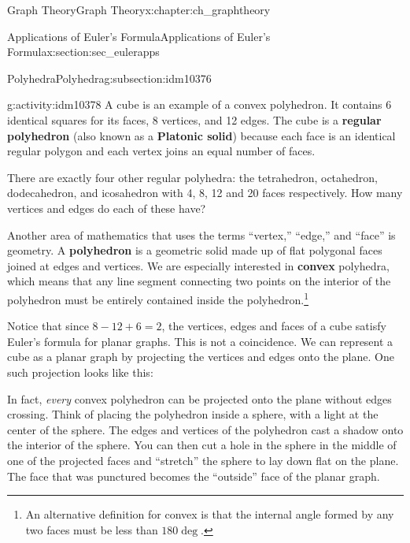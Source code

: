 \documentclass[oneside,10pt,]{book}
\newcommand{\terminology}[1]{\textbf{#1}}
\numberwithin{equation}{chapter}
\newcommand{\vtx}[2]{node[fill,circle,inner sep=0pt, minimum size=4pt,label=#1:#2]{}}
\renewcommand{\v}{\vtx{above}{}}
\begin{document}
\begin{chapterptx}{Graph Theory}{}{Graph Theory}{}{}{x:chapter:ch_graphtheory}
\begin{sectionptx}{Applications of Euler's Formula}{}{Applications of Euler's Formula}{}{}{x:section:sec_eulerapps}
\begin{subsectionptx}{Polyhedra}{}{Polyhedra}{}{}{g:subsection:idm10376}
\begin{activity}{}{g:activity:idm10378}
A cube is an example of a convex polyhedron. It contains 6 identical squares for its faces, 8 vertices, and 12 edges. The cube is a \terminology{regular polyhedron} (also known as a \terminology{Platonic solid}) because each face is an identical regular polygon and each vertex joins an equal number of faces.%
\par
There are exactly four other regular polyhedra: the tetrahedron, octahedron, dodecahedron, and icosahedron with 4, 8, 12 and 20 faces respectively. How many vertices and edges do each of these have?%
\end{activity}
Another area of mathematics that uses the terms ``vertex,'' ``edge,'' and ``face'' is geometry. A \terminology{polyhedron} is a geometric solid made up of flat polygonal faces joined at edges and vertices. We are especially interested in \terminology{convex} polyhedra, which means that any line segment connecting two points on the interior of the polyhedron must be entirely contained inside the polyhedron.\footnote{An alternative definition for convex is that the internal angle formed by any two faces must be less than \(180\deg\).\label{g:fn:idm10398}}%
\par
Notice that since \(8 - 12 + 6 = 2\), the vertices, edges and faces of a cube satisfy Euler's formula for planar graphs. This is not a coincidence. We can represent a cube as a planar graph by projecting the vertices and edges onto the plane. One such projection looks like this:%
\begin{sidebyside}{1}{0.4}{0.4}{0}%
\begin{sbspanel}{0.2}%
\resizebox{\linewidth}{!}{%
\begin{tikzpicture}
  \foreach \ang in {45, 135, 225, 315} {
  \draw (\ang:.4) \v -- (\ang:1) \v -- (\ang+90:1) (\ang:.4) -- (\ang+90:.4);
  }
  \end{tikzpicture}
}%
\end{sbspanel}%
\end{sidebyside}%
\par
In fact, \emph{every} convex polyhedron can be projected onto the plane without edges crossing. Think of placing the polyhedron inside a sphere, with a light at the center of the sphere. The edges and vertices of the polyhedron cast a shadow onto the interior of the sphere. You can then cut a hole in the sphere in the middle of one of the projected faces and ``stretch'' the sphere to lay down flat on the plane. The face that was punctured becomes the ``outside'' face of the planar graph.%

\end{subsectionptx}
\end{sectionptx}
\end{chapterptx}
\end{document}
